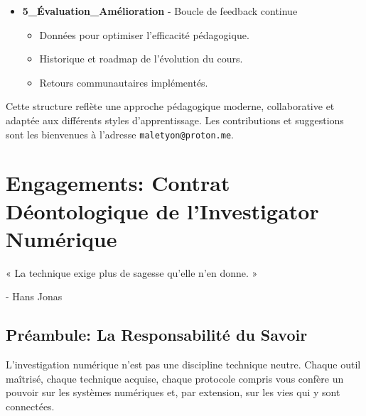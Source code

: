\documentclass[11pt,a4paper,oneside]{book}
\begin{document}
\begin{itemize}
                \item \textbf{5\_Évaluation\_Amélioration} - Boucle de feedback continue
                \begin{itemize}
                    \item Données pour optimiser l'efficacité pédagogique.
                    \item Historique et roadmap de l'évolution du cours.
                    \item Retours communautaires implémentés.
                \end{itemize}
            \end{itemize}

            \vspace{0.5cm}

            \noindent Cette structure reflète une approche pédagogique moderne, collaborative et adaptée aux différents styles d'apprentissage. Les contributions et suggestions sont les bienvenues à l'adresse \texttt{maletyon@proton.me}.
            \hfill\textit{}

        \chapter*{Engagements: Contrat Déontologique de l'Investigator Numérique}
        \epigraph{« La technique exige plus de sagesse qu'elle n'en donne. »}{- Hans Jonas}

        \begin{center}
        \end{center}

        \section*{Préambule: La Responsabilité du Savoir}
        L'investigation numérique n'est pas une discipline technique neutre. Chaque outil maîtrisé, chaque technique acquise, chaque protocole compris vous confère un pouvoir sur les systèmes numériques et, par extension, sur les vies qui y sont connectées.
\end{document}
